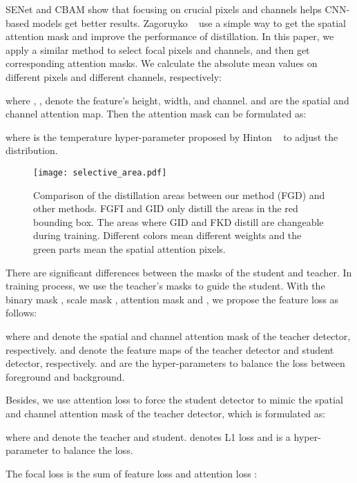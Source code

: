 \documentclass[10pt,twocolumn,letterpaper]{article}
\begin{document}
SENet\cite{hu2018squeeze} and CBAM\cite{woo2018cbam} show that focusing on crucial pixels and channels helps CNN-based models get better results. Zagoruyko \etal~\cite{zagoruyko2016paying} use a simple way to get the spatial attention mask and improve the performance of distillation. In this paper, we apply a similar method to select focal pixels and channels, and then get corresponding attention masks. We calculate the absolute mean values on different pixels and different channels, respectively:




where , ,  denote the feature's height, width, and channel.  and  are the spatial and channel attention map. Then the attention mask can be formulated as:



where  is the temperature hyper-parameter proposed by Hinton \etal~\cite{hinton2015distilling} to adjust the distribution.

\begin{figure}
  \centering
  \texttt{[image: selective\_area.pdf]}
  \caption{Comparison of the distillation areas between our method (FGD) and other methods. FGFI and GID only distill the areas in the red bounding box. The areas where GID and FKD distill are changeable during training. Different colors mean different weights and the green parts mean the spatial attention pixels.}
  \label{figure:selective area}
\end{figure}

There are significant differences between the masks of the student and teacher. In training process, we use the teacher's masks to guide the student. With the binary mask , scale mask , attention mask  and , we propose the feature loss  as follows:


where  and  denote the spatial and channel attention mask of the teacher detector, respectively.  and  denote the feature maps of the teacher detector and student detector, respectively.  and  are the hyper-parameters to balance the loss between foreground and background.

Besides, we use attention loss  to force the student detector to mimic the spatial and channel attention mask of the teacher detector, which is formulated as:


where  and  denote the teacher and student.  denotes L1 loss and  is a  hyper-parameter to balance the loss.

The focal loss  is the sum of feature loss  and attention loss :
\end{document}
